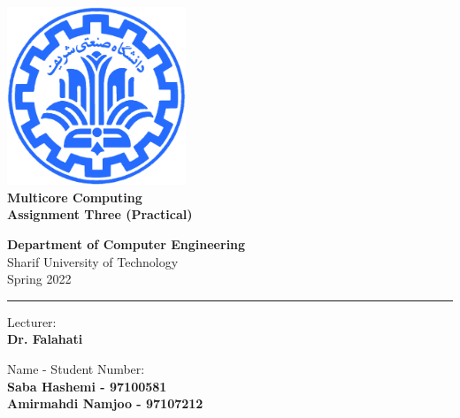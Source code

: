 \documentclass[12pt]{article}
\begin{document}
	
	
	\begin{titlepage}
		\begin{center}
			
			\vspace*{0.7cm}
			
			\includegraphics[width=0.4\textwidth]{sharif1.png}\\
			\vspace{0.5cm}
			\textbf{ \Huge{Multicore Computing} }\\
			\vspace{0.5cm}
			\textbf{ \Large{ Assignment Three (Practical)} }
			\vspace{0.2cm}
			
			
			\large \textbf{Department of Computer Engineering}\\\vspace{0.2cm}
			\large   Sharif University of Technology\\\vspace{0.2cm}
			\large   Spring 2022 \\\vspace{0.2cm}
			\noindent\rule[1ex]{\linewidth}{1pt}
			Lecturer:\\
			\textbf{{Dr. Falahati}}
			
			
			\vspace{0.15cm}
			Name - Student Number:\\
			
			\textbf{{Saba Hashemi - 97100581}}\\
			
			\textbf{{Amirmahdi Namjoo - 97107212}}
		\end{center}
	\end{titlepage}
	
	
	\newpage
	\pagestyle{fancy}
	\fancyhf{}
	\fancyfoot{}
	\cfoot{\thepage}
	
\end{document}
